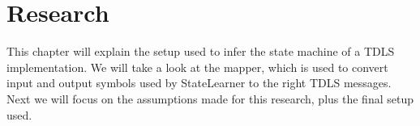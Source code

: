 \chapter{Research}\label{research}

This chapter will explain the setup used to infer the state machine of a TDLS implementation.
We will take a look at the mapper, which is used to convert input and output symbols used by StateLearner to the right TDLS messages. Next we will focus on the assumptions made for this research, plus the final setup used.




